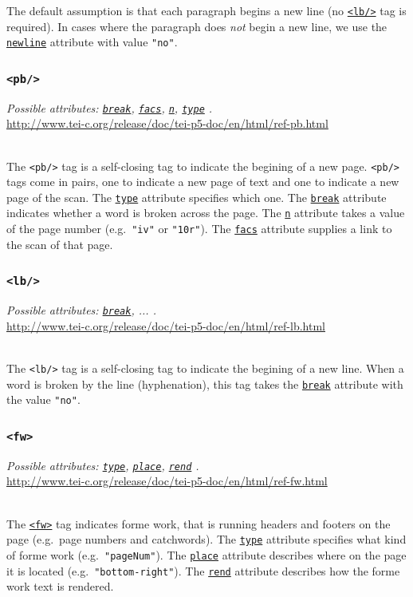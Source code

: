 \documentclass[12pt,a4paper]{article}
\newcommand{\taglinks}[2]{
\vspace*{-0.5ex}
\hspace*{\parindent}
\begin{minipage}{\textwidth}
  \emph{Possible attributes: #1.} \\ \url{#2} \end{minipage} \vspace{0.5ex} \\ }
\begin{document}
The default assumption is that each paragraph begins a new line (no \hyperref[tag-sec:lb]{\texttt{<lb/>}} tag is required).  In cases where the paragraph does \emph{not} begin a new line, we use the \hyperref[att-sec:newline]{\texttt{newline}} attribute with value \texttt{"no"}.

\subsubsection{\texttt{<pb/>}} \label{tag-sec:pb}

\taglinks{
\hyperref[att-sec:break]{\texttt{break}}, 
\hyperref[att-sec:facs]{\texttt{facs}}, 
\hyperref[att-sec:n]{\texttt{n}}, 
\hyperref[att-sec:type]{\texttt{type}} 
}
{http://www.tei-c.org/release/doc/tei-p5-doc/en/html/ref-pb.html}
%
The \texttt{<pb/>} tag is a self-closing tag to indicate the begining of a new page.  \texttt{<pb/>} tags come in pairs, one to indicate a new page of text and one to indicate a new page of the scan.  The \hyperref[att-sec:type]{\texttt{type}} attribute specifies which one.  The \hyperref[att-sec:break]{\texttt{break}} attribute indicates whether a word is broken across the page.  The \hyperref[att-sec:n]{\texttt{n}} attribute takes a value of the page number (e.g.\ \texttt{"iv"} or \texttt{"10r"}).  The \hyperref[att-sec:facs]{\texttt{facs}} attribute supplies a link to the scan of that page.

\subsubsection{\texttt{<lb/>}} \label{tag-sec:lb}
\taglinks{
\hyperref[att-sec:break]{\texttt{break}}, ... }
{http://www.tei-c.org/release/doc/tei-p5-doc/en/html/ref-lb.html}
%
The \texttt{<lb/>} tag is a self-closing tag to indicate the begining of a new line.  When a word is broken by the line (hyphenation), this tag takes the \hyperref[att-sec:break]{\texttt{break}} attribute with the value \texttt{"no"}.

\subsubsection{\texttt{<fw>}} \label{tag-sec:fw}
\taglinks{
\hyperref[att-sec:type]{\texttt{type}}, 
\hyperref[att-sec:place]{\texttt{place}}, 
\hyperref[att-sec:rend]{\texttt{rend}}
}
{http://www.tei-c.org/release/doc/tei-p5-doc/en/html/ref-fw.html}
%
The \hyperref[tag-sec:fw]{\texttt{<fw>}} tag indicates forme work, that is running headers and footers on the page (e.g.\ page numbers and catchwords).  The \hyperref[att-sec:type]{\texttt{type}} attribute specifies what kind of forme work (e.g.\ \texttt{"pageNum"}).  The \hyperref[att-sec:place]{\texttt{place}} attribute describes where on the page it is located (e.g.\ \texttt{"bottom-right"}).  The \hyperref[att-sec:rend]{\texttt{rend}} attribute describes how the forme work text is rendered.
\end{document}
